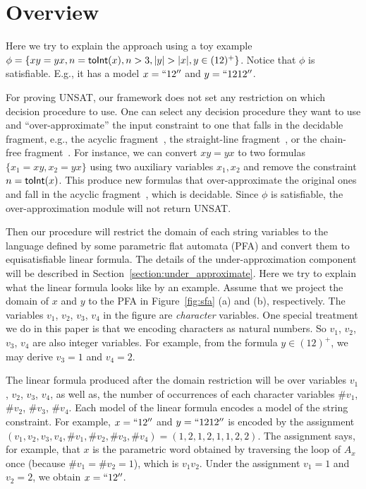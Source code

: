 \documentclass[sigplan,review,anonymous]{acmart}\settopmatter{printfolios=true,printccs=false,printacmref=false}
\begin{document}
\section{Overview} \label{section:overview}

Here we try to explain the approach using a toy example $\phi = \{xy=yx, n = \sti{x}, n >3 ,|y|>|x|, y \in (12)^+\}$. Notice that $\phi$ is satisfiable. E.g., it has a model $x=``12''$ and $y=``1212''$.

For proving UNSAT, our framework does not set any restriction on which decision procedure to use. One can select any decision procedure they want to use and ``over-approximate'' the input constraint to one that falls in the decidable fragment, e.g., the acyclic fragment~\cite{abdulla2014string}, the straight-line fragment~\cite{chen2019decision}, or the chain-free fragment~\cite{abdulla2019chain}. For instance, we can convert $xy=yx$ to two formulas $\{x_1=xy, x_2=yx\}$ using two auxiliary variables $x_1,x_2$ and remove the constraint $n=\mbox{\textsf{toInt}($x$)}$. This produce new formulas that over-approximate the original ones and fall in the acyclic fragment~\cite{abdulla2014string}, which is decidable. Since $\phi$ is satisfiable, the over-approximation module will not return UNSAT. 

Then our procedure will restrict the domain of each string variables to the language defined by some parametric flat automata (PFA) and convert them to equisatisfiable linear formula. The details of the under-approximation component will be described in Section~\ref{section:under_approximate}. Here we try to explain what the linear formula looks like by an example. Assume that we project the domain of $x$ and $y$ to the PFA in Figure~\ref{fig:sfa} (a) and (b), respectively. The variables $v_1$, $v_2$, $v_3$, $v_4$ in the figure are \emph{character} variables. One special treatment we do in this paper is that we encoding characters as natural numbers. So $v_1$, $v_2$, $v_3$, $v_4$ are also integer variables. For example, from the formula $ y \in (12)^+$, we may derive $v_3=1$ and $v_4=2$. 

The linear formula produced after the domain restriction will be over variables $v_1$, $v_2$, $v_3$, $v_4$,  as well as, the number of occurrences of each character variables $\#v_1$, $\#v_2$, $\#v_3$, $\#v_4$. Each model of the linear formula encodes a model of the string constraint. For example, $x=``12''$ and $y=``1212''$ is encoded by the assignment $(v_1,v_2,v_3,v_4,\#v_1,\#v_2,\#v_3,\#v_4)= (1,2,1,2,1,1,2,2)$. The assignment says, for example, that $x$ is the parametric word obtained by traversing the loop of $A_x$ once (because $\#v_1 = \#v_2 = 1$), which is $v_1v_2$. Under the assignment $v_1=1$ and $v_2=2$, we obtain $x=``12''$.
\end{document}
